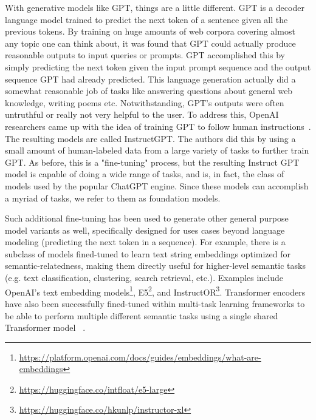 \documentclass{article}
\begin{document}
With generative models like GPT, things are a little different. GPT is a decoder language model trained to predict the next token of a sentence given all the previous tokens. By training on huge amounts of web corpora covering almost any topic one can think about, it was found that GPT could actually produce reasonable outputs to input queries or prompts. GPT accomplished this by simply predicting the next token given the input prompt sequence and the output sequence GPT had already predicted. This language generation actually did a somewhat reasonable job of tasks like answering questions about general web knowledge, writing poems etc. Notwithstanding, GPT's outputs were often untruthful or really not very helpful to the user. To address this, OpenAI researchers came up with the idea of training GPT to follow human instructions~. The resulting models are called InstructGPT. The authors did this by using a small amount of human-labeled data from a large variety of tasks to further train GPT. As before, this is a "fine-tuning" process, but the resulting Instruct GPT model is capable of doing a wide range of tasks, and is, in fact, the class of models used by the popular ChatGPT engine. Since these models can accomplish a myriad of tasks, we refer to them as foundation models.

Such additional fine-tuning has been used to generate other general purpose model variants as well, specifically designed for uses cases beyond language modeling (predicting the next token in a sequence). For example, there is a subclass of models fined-tuned to learn text string embeddings optimized for semantic-relatedness, making them directly useful for higher-level semantic tasks (e.g. text classification, clustering, search retrieval, etc.). Examples include OpenAI's text embedding models\footnote{\url{https://platform.openai.com/docs/guides/embeddings/what-are-embeddings}}, E5\footnote{\url{https://huggingface.co/intfloat/e5-large}}, and InstructOR\footnote{\url{https://huggingface.co/hkunlp/instructor-xl}}. Transformer encoders have also been successfully fined-tuned within multi-task learning frameworks to be able to perform multiple different semantic tasks using a single shared Transformer model ~.
\end{document}
